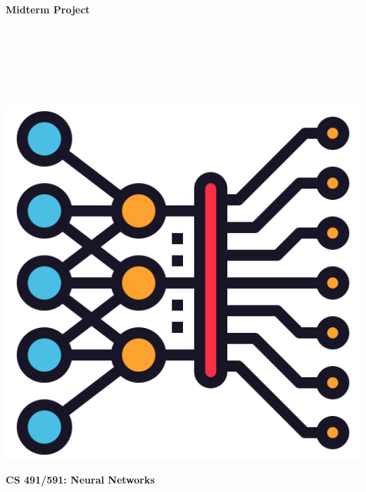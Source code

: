 \documentclass{article}
\begin{document}
\begin{titlepage}
\begin{center}
\vspace*{1cm}
            
\Huge
\textbf{Midterm Project}
            
\vspace{1cm}

\Large
{}

\vspace{2cm}

 \\
 \\
 \\
 \\
 \\

\vspace{2cm}

\includegraphics[scale=0.25]{figs/icon.png}\\[0.5cm]

\vspace{9cm}

\textbf{CS 491/591: Neural Networks} \\

\end{center}
\end{titlepage}
\newpage
\end{document}

